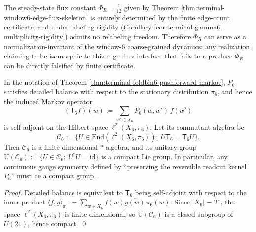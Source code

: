 \begin{remark}[Normalization-invariant status of the boundary flux constant \texorpdfstring{$\Phi_R=\tfrac1{12}$}{PhiR=1/12}]\label{rem:window6-boundary-flux-phiR-normalization}
The steady-state flux constant \(\Phi_R=\frac1{12}\) given by Theorem \ref{thm:terminal-window6-edge-flux-skeleton} is entirely determined by the finite edge-count certificate,
and under labeling rigidity (Corollary \ref{cor:terminal-gamma6-multiplicity-rigidity}) admits no relabeling freedom.
Therefore \(\Phi_R\) can serve as a normalization-invariant of the window-\(6\) coarse-grained dynamics: any realization claiming to be isomorphic to this edge--flux interface that fails to reproduce \(\Phi_R\) can be directly falsified by finite certificate.
\end{remark}

\begin{corollary}\label{cor:window6-p6-compactness-principle}
In the notation of Theorem \ref{thm:terminal-foldbin6-pushforward-markov}, \(P_6\) satisfies detailed balance with respect to the stationary distribution \(\pi_6\), and hence the induced Markov operator
\[
(\mathsf{T}_6 f)(w):=\sum_{w'\in X_6} P_6(w,w')\,f(w')
\]
is self-adjoint on the Hilbert space \(\ell^2(X_6,\pi_6)\).
Let its commutant algebra be
\[
\mathcal{C}_6:=\bigl\{U\in \mathrm{End}(\ell^2(X_6,\pi_6)):\ U\mathsf{T}_6=\mathsf{T}_6U\bigr\}.
\]
Then \(\mathcal{C}_6\) is a finite-dimensional \(*\)-algebra, and its unitary group
\(
\mathrm{U}(\mathcal{C}_6):=\{U\in\mathcal{C}_6:\ U^*U=\mathrm{id}\}
\)
is a compact Lie group.
In particular, any continuous gauge symmetry defined by ``preserving the reversible readout kernel \(P_6\)'' must be a compact group.
\end{corollary}
\begin{proof}
Detailed balance is equivalent to \(\mathsf{T}_6\) being self-adjoint with respect to the inner product \(\langle f,g\rangle_{\pi_6}:=\sum_{w\in X_6} f(w)\overline{g(w)}\,\pi_6(w)\).
Since \(|X_6|=21\), the space \(\ell^2(X_6,\pi_6)\) is finite-dimensional, so \(\mathrm{U}(\mathcal{C}_6)\) is a closed subgroup of \(U(21)\), hence compact. \qed
\end{proof}


